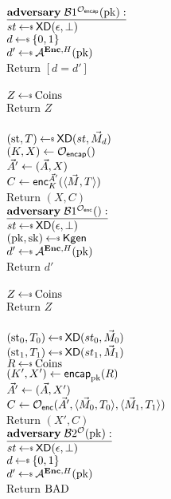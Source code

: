 \begin{figure}[tbhp]
\begin{center}
{
 {$\adversaryv{\;\advB1^{\mathcal{O}_\encap}(\pk)}$}\\
$st \getsr \mdalg(\epsilon,\bot)$\\
$d \getsr \bits$\\
$d' \getsr \advA^{\encOracle,H}(\pk)$\\
Return $[d=d']$\\ 

\\
  $Z \getsr \mathrm{Coins}$\\
  Return $Z$\\

\\
$(\st, \umd) \getsr \mdalg(st,\vmsg_d)$\\
$(K,X) \gets \mathcal{O}_\encap()$\\
$\vec{A}' \gets (\vec{A}, X)$\\
$C \gets {\mathsf{enc}}_{K}^{\vec{A}'}(\langle \vec{M}, T\rangle)$\\
Return $(X,C)$\\
}
{
{$\adversaryv{\;\advB1^{\mathcal{O}_\enc}()}$}\\
$st \getsr \mdalg(\epsilon,\bot)$\\
$(\pk,\sk)\getsr\Kgen$\\
$d' \getsr \advA^{\encOracle,H}(\pk)$\\
Return $d'$\\ 

\\
  $Z \getsr \mathrm{Coins}$\\
  Return $Z$\\

\\
$(\st_0, \umd_0) \getsr \mdalg(st_0,\vmsg_0)$\\
$(\st_1, \umd_1) \getsr \mdalg(st_1,\vmsg_1)$\\
$R \getsr \mathrm{Coins}$\\
$(K',X') \gets \mathsf{encap}_{\mathrm{pk}}^{}(R)$\\
$\vec{A}' \gets (\vec{A}, X')$\\
$C \gets \mathcal{O}_{\mathsf{enc}}(\vec{A}',\langle \vec{M}_0,T_0\rangle, \langle \vec{M}_1,T_1\rangle)$\\
Return $(X',C)$\\
}
{
{$\adversaryv{\;\advB2^{\mathcal{O}}(\pk)}$}\\
$st \getsr \mdalg(\epsilon,\bot)$\\
$d \getsr \bits$\\ 
$d' \getsr \advA^{\encOracle,H}(\pk)$\\
Return $\mathrm{BAD}$\\ 

}
\end{center}
\end{figure}
